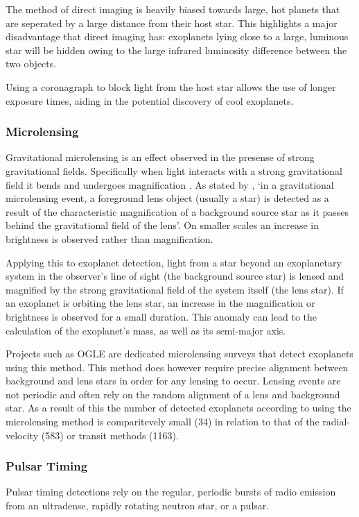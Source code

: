 \documentclass{report}
\begin{document}
The method of direct imaging is heavily biased towards large, hot planets that are seperated by a large distance from their host star. This highlights a major disadvantage that direct imaging has: exoplanets lying close to a large, luminous star will be hidden owing to the large infrared luminosity difference between the two objects.   

Using a coronagraph to block light from the host star allows the use of longer exposure times, aiding in the potential discovery of cool exoplanets. 

\subsubsection{Microlensing }
Gravitational microlensing is an effect observed in the presense of strong gravitational fields. Specifically when light interacts with a strong gravitational field it bends and undergoes magnification \parencite{einstein}. As stated by \textcite{micro}, `in a gravitational microlensing event, a foreground lens object (usually a star) is detected as a result of the characteristic magnification of a background source star as it passes behind the gravitational field of the lens'. On smaller scales an increase in brightness is observed rather than magnification.

Applying this to exoplanet detection, light from a star beyond an exoplanetary system in the observer's line of sight (the background source star) is lensed and magnified by the strong gravitational field of the system itself (the lens star). If an exoplanet is orbiting the lens star, an increase in the magnification or brightness is observed for a small duration. This anomaly can lead to the calculation of the exoplanet's mass, as well as its semi-major axis.

Projects such as OGLE are dedicated microlensing surveys that detect exoplanets using this method. This method does however require precise alignment between background and lens stars in order for any lensing to occur. Lensing events are not periodic and often rely on the random alignment of a lens and background star. As a result of this the number of detected exoplanets according to \textcite{exo} using the microlensing method is comparitevely small (34) in relation to that of the radial-velocity (583) or transit methods (1163). 

\subsubsection{Pulsar Timing}
Pulsar timing detections rely on the regular, periodic bursts of radio emission from an ultradense, rapidly rotating neutron star, or a pulsar.
\end{document}
